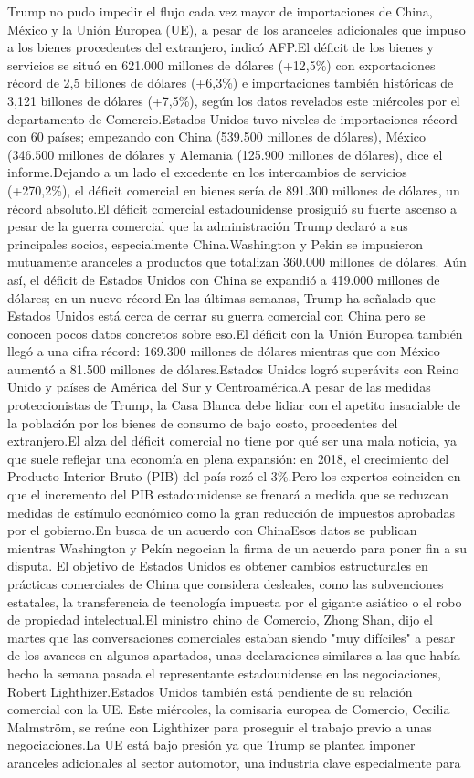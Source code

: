 \documentclass{article}%
\begin{document}
Trump no pudo impedir el flujo cada vez mayor de importaciones de China, México y la Unión Europea (UE), a pesar de los aranceles adicionales que impuso a los bienes procedentes del extranjero, indicó AFP.El déficit de los bienes y servicios se situó en 621.000 millones de dólares (+12,5\%) con exportaciones récord de 2,5 billones de dólares (+6,3\%) e importaciones también históricas de 3,121 billones de dólares (+7,5\%), según los datos revelados este miércoles por el departamento de Comercio.Estados Unidos tuvo niveles de importaciones récord con 60 países; empezando con China (539.500 millones de dólares), México (346.500 millones de dólares y Alemania (125.900 millones de dólares), dice el informe.Dejando a un lado el excedente en los intercambios de servicios (+270,2\%), el déficit comercial en bienes sería de 891.300 millones de dólares, un récord absoluto.El déficit comercial estadounidense prosiguió su fuerte ascenso a pesar de la guerra comercial que la administración Trump declaró a sus principales socios, especialmente China.Washington y Pekin se impusieron mutuamente aranceles a productos que totalizan 360.000 millones de dólares. Aún así, el déficit de Estados Unidos con China se expandió a 419.000 millones de dólares; en un nuevo récord.En las últimas semanas, Trump ha señalado que Estados Unidos está cerca de cerrar su guerra comercial con China pero se conocen pocos datos concretos sobre eso.El déficit con la Unión Europea también llegó a una cifra récord: 169.300 millones de dólares mientras que con México aumentó a 81.500 millones de dólares.Estados Unidos logró superávits con Reino Unido y países de América del Sur y Centroamérica.A pesar de las medidas proteccionistas de Trump, la Casa Blanca debe lidiar con el apetito insaciable de la población por los bienes de consumo de bajo costo, procedentes del extranjero.El alza del déficit comercial no tiene por qué ser una mala noticia, ya que suele reflejar una economía en plena expansión: en 2018, el crecimiento del Producto Interior Bruto (PIB) del país rozó el 3\%.Pero los expertos coinciden en que el incremento del PIB estadounidense se frenará a medida que se reduzcan medidas de estímulo económico como la gran reducción de impuestos aprobadas por el gobierno.En busca de un acuerdo con ChinaEsos datos se publican mientras Washington y Pekín negocian la firma de un acuerdo para poner fin a su disputa. El objetivo de Estados Unidos es obtener cambios estructurales en prácticas comerciales de China que considera desleales, como las subvenciones estatales, la transferencia de tecnología impuesta por el gigante asiático o el robo de propiedad intelectual.El ministro chino de Comercio, Zhong Shan, dijo el martes que las conversaciones comerciales estaban siendo "muy difíciles" a pesar de los avances en algunos apartados, unas declaraciones similares a las que había hecho la semana pasada el representante estadounidense en las negociaciones, Robert Lighthizer.Estados Unidos también está pendiente de su relación comercial con la UE. Este miércoles, la comisaria europea de Comercio, Cecilia Malmström, se reúne con Lighthizer para proseguir el trabajo previo a unas negociaciones.La UE está bajo presión ya que Trump se plantea imponer aranceles adicionales al sector automotor, una industria clave especialmente para 
\end{document}
